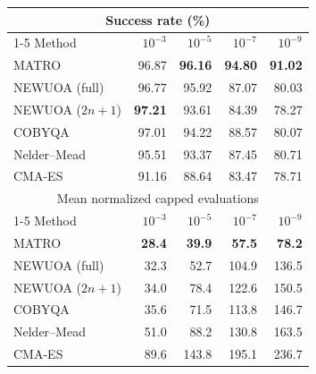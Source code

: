 \begin{tabular}{lrrrr}
\toprule
\multicolumn{5}{c}{Success rate (\%)} \\
\cmidrule(lr){1-5}
Method & $10^{-3}$ & $10^{-5}$ & $10^{-7}$ & $10^{-9}$ \\
\midrule
MATRO & 96.87 & \textbf{96.16} & \textbf{94.80} & \textbf{91.02} \\
NEWUOA (full) & 96.77 & 95.92 & 87.07 & 80.03 \\
NEWUOA ($2n+1$) & \textbf{97.21} & 93.61 & 84.39 & 78.27 \\
COBYQA & 97.01 & 94.22 & 88.57 & 80.07 \\
Nelder--Mead & 95.51 & 93.37 & 87.45 & 80.71 \\
CMA-ES & 91.16 & 88.64 & 83.47 & 78.71 \\
\midrule
\multicolumn{5}{c}{Mean normalized capped evaluations} \\
\cmidrule(lr){1-5}
Method & $10^{-3}$ & $10^{-5}$ & $10^{-7}$ & $10^{-9}$ \\
\midrule
MATRO & \textbf{28.4} & \textbf{39.9} & \textbf{57.5} & \textbf{78.2} \\
NEWUOA (full) & 32.3 & 52.7 & 104.9 & 136.5 \\
NEWUOA ($2n+1$) & 34.0 & 78.4 & 122.6 & 150.5 \\
COBYQA & 35.6 & 71.5 & 113.8 & 146.7 \\
Nelder--Mead & 51.0 & 88.2 & 130.8 & 163.5 \\
CMA-ES & 89.6 & 143.8 & 195.1 & 236.7 \\
\bottomrule
\end{tabular}
